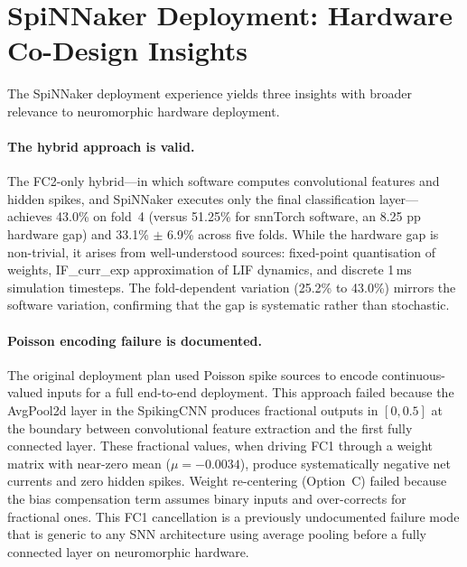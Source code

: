 \section{SpiNNaker Deployment: Hardware Co-Design Insights}
\label{sec:spinnaker-insights}

The SpiNNaker deployment experience yields three insights with broader relevance to neuromorphic hardware deployment.

\paragraph{The hybrid approach is valid.}
The FC2-only hybrid---in which software computes convolutional features and hidden spikes, and SpiNNaker executes only the final classification layer---achieves 43.0\% on fold~4 (versus 51.25\% for snnTorch software, an 8.25 pp hardware gap) and 33.1\% $\pm$ 6.9\% across five folds. While the hardware gap is non-trivial, it arises from well-understood sources: fixed-point quantisation of weights, IF\_curr\_exp approximation of LIF dynamics, and discrete 1\,ms simulation timesteps. The fold-dependent variation (25.2\% to 43.0\%) mirrors the software variation, confirming that the gap is systematic rather than stochastic.

\paragraph{Poisson encoding failure is documented.}
The original deployment plan used Poisson spike sources to encode continuous-valued inputs for a full end-to-end deployment. This approach failed because the AvgPool2d layer in the SpikingCNN produces fractional outputs in $[0, 0.5]$ at the boundary between convolutional feature extraction and the first fully connected layer. These fractional values, when driving FC1 through a weight matrix with near-zero mean ($\mu = -0.0034$), produce systematically negative net currents and zero hidden spikes. Weight re-centering (Option~C) failed because the bias compensation term assumes binary inputs and over-corrects for fractional ones. This FC1 cancellation is a previously undocumented failure mode that is generic to any SNN architecture using average pooling before a fully connected layer on neuromorphic hardware.

